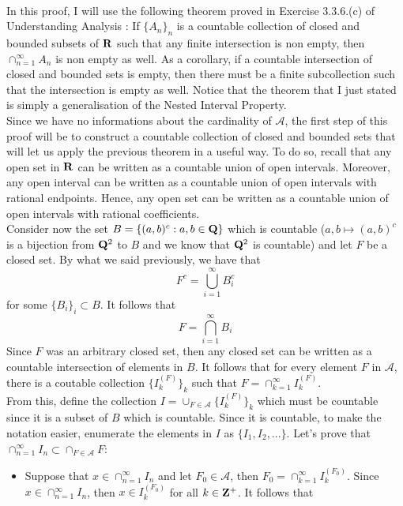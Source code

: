 \begin{solution}
    \\ In this proof, I will use the following theorem proved in Exercise 3.3.6.(c) of Understanding Analysis : If $\{A_n\}_n$ is a countable collection of closed and bounded subsets of $\mathbf{R}$ such that any finite intersection is non empty, then $\cap_{n=1}^{\infty}A_n$ is non empty as well. As a corollary, if a countable intersection of closed and bounded sets is empty, then there must be a finite subcollection such that the intersection is empty as well. Notice that the theorem that I just stated is simply a generalisation of the Nested Interval Property.
    \\ Since we have no informations about the cardinality of $\mathcal{A}$, the first step of this proof will be to construct a countable collection of closed and bounded sets that will let us apply the previous theorem in a useful way. To do so, recall that any open set in $\mathbf{R}$ can be written as a countable union of open intervals. Moreover, any open interval can be written as a countable union of open intervals with rational endpoints. Hence, any open set can be written as a countable union of open intervals with rational coefficients.\\
    Consider now the set $B = \{(a,b)^c : a,b \in \mathbf{Q}\}$ which is countable ($a,b \mapsto (a,b)^c$ is a bijection from $\mathbf{Q}^2$ to $B$ and we know that $\mathbf{Q}^2$ is countable) and let $F$ be a closed set. By what we said previously, we have that 
    $$F^c = \bigcup_{i=1}^{\infty}B_i^c$$
    for some $\{B_i\}_i \subset B$. It follows that
    $$F = \bigcap_{i=1}^{\infty}B_i$$
    Since $F$ was an arbitrary closed set, then any closed set can be written as a countable intersection of elements in $B$. It follows that for every element $F$ in $\mathcal{A}$, there is a coutable collection $\{I_k^{(F)}\}_{k}$ such that $F = \cap_{k=1}^{\infty}I_k^{(F)}$. \\
    From this, define the collection $I = \cup_{F \in \mathcal{A}}\{I_k^{(F)}\}_{k}$ which must be countable since it is a subset of $B$ which is countable. Since it is countable, to make the notation easier, enumerate the elements in $I$ as $\{I_1, I_2, ...\}$. Let's prove that $\cap_{n=1}^{\infty}I_n \subset \cap_{F\in\mathcal{A}}F$:
    \begin{itemize}
        \item Suppose that $x \in \cap_{n=1}^{\infty}I_n$ and let $F_0 \in \mathcal{A}$, then $F_0 = \cap_{k=1}^{\infty}I_k^{(F_0)}$. Since $x \in \cap_{n=1}^{\infty}I_n$, then $x \in I_k^{(F_0)}$ for all $k \in \mathbf{Z}^+$. It follows that

\end{itemize}
\end{solution}
